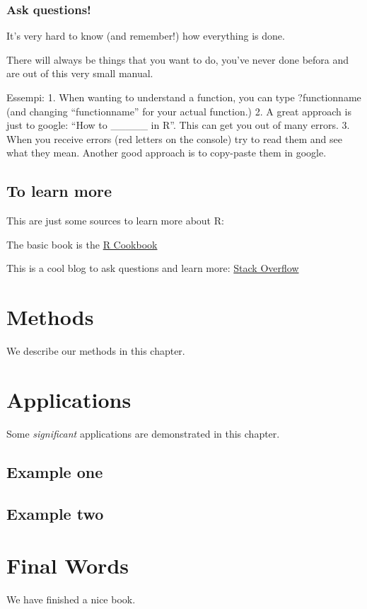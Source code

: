\documentclass[
]{book}
\begin{document}
\hypertarget{ask-questions}{%
\subsection{Ask questions!}\label{ask-questions}}

It's very hard to know (and remember!) how everything is done.

There will always be things that you want to do, you've never done befora and are out of this very small manual.

Essempi:
1. When wanting to understand a function, you can type ?functionname (and changing ``functionname'' for your actual function.)
2. A great approach is just to google: ``How to \_\_\_\_\_ in R''. This can get you out of many errors.
3. When you receive errors (red letters on the console) try to read them and see what they mean. Another good approach is to copy-paste them in google.

\hypertarget{to-learn-more}{%
\section{To learn more}\label{to-learn-more}}

This are just some sources to learn more about R:

The basic book is the \href{https://rc2e.com/}{R Cookbook}

This is a cool blog to ask questions and learn more: \href{https://stackoverflow.com/}{Stack Overflow}

\hypertarget{methods}{%
\chapter{Methods}\label{methods}}

We describe our methods in this chapter.

\hypertarget{applications}{%
\chapter{Applications}\label{applications}}

Some \emph{significant} applications are demonstrated in this chapter.

\hypertarget{example-one}{%
\section{Example one}\label{example-one}}

\hypertarget{example-two}{%
\section{Example two}\label{example-two}}

\hypertarget{final-words}{%
\chapter{Final Words}\label{final-words}}

We have finished a nice book.

  
\end{document}
